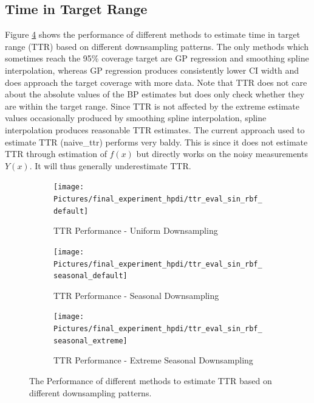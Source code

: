 \subsection{Time in Target Range}

Figure \ref{fig:ttr-performance} shows the performance of different methods to
estimate time in target range (TTR) based on different downsampling patterns.
The only methods which sometimes reach the 95\% coverage target are
GP regression and smoothing spline interpolation, whereas GP regression produces
consistently lower CI width and does approach the target coverage with more
data.
Note that TTR does not care about the absolute values of the BP estimates
but does only check whether they are within the target range.
Since TTR is not affected by the extreme estimate values
occasionally produced by smoothing spline interpolation,
spline interpolation produces reasonable TTR estimates.
The current approach used to estimate TTR (naive\_ttr) performs very baldy.
This is since it does not estimate TTR through estimation of $f(x)$ but directly
works on the noisy measurements $Y(x)$. It will thus generally underestimate
TTR.


\begin{figure}[!ht]
\centering
\begin{subfigure}{\textwidth}
    \centering
    \texttt{[image: Pictures/final\_experiment\_hpdi/ttr\_eval\_sin\_rbf\_default]}
    \caption{TTR Performance - Uniform Downsampling}
    \label{fig:ttr-uniform-sampling-performance}
\end{subfigure}

\bigskip

\begin{subfigure}{\textwidth}
    \centering
    \texttt{[image: Pictures/final\_experiment\_hpdi/ttr\_eval\_sin\_rbf\_seasonal\_default]}
    \caption{TTR Performance - Seasonal Downsampling}
    \label{fig:ttr-seasonal-sampling-performance}
\end{subfigure}

\bigskip

\begin{subfigure}{\textwidth}
    \centering
    \texttt{[image: Pictures/final\_experiment\_hpdi/ttr\_eval\_sin\_rbf\_seasonal\_extreme]}
    \caption{TTR Performance - Extreme Seasonal Downsampling}
    \label{fig:ttr-extreme-seasonal-sampling-performance}
\end{subfigure}

\caption[TTR Performance]{The Performance of different methods to
estimate TTR based on different downsampling patterns.
}
\label{fig:ttr-performance}
\end{figure}





